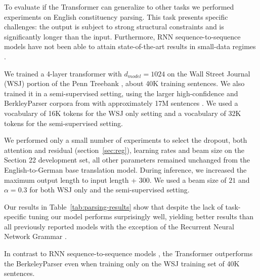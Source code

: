 To evaluate if the Transformer can generalize to other tasks we performed
experiments on English constituency parsing. This task presents specific
challenges: the output is subject to strong structural constraints and is
significantly longer than the input.
Furthermore, RNN sequence-to-sequence models have not been able to attain
state-of-the-art results in small-data regimes \cite{KVparse15}.

We trained a 4-layer transformer with $d_{model} = 1024$ on the Wall Street
Journal (WSJ) portion of the Penn Treebank \citep{marcus1993building}, about
40K training sentences. We also trained it in a semi-supervised setting, using
the larger high-confidence and BerkleyParser corpora from with approximately
17M sentences \citep{KVparse15}. We used a vocabulary of 16K tokens for the WSJ
only setting and a vocabulary of 32K tokens for the semi-supervised setting.

We performed only a small number of experiments to select the dropout, both
attention and residual (section~\ref{sec:reg}), learning rates and beam size on
the Section 22 development set, all other parameters remained unchanged from
the English-to-German base translation model. During inference, we increased
the maximum output length to input length + $300$. We used a beam size of $21$
and $\alpha=0.3$ for both WSJ only and the semi-supervised setting.

Our results in Table~\ref{tab:parsing-results} show that despite the lack of
task-specific tuning our model performs surprisingly well, yielding better
results than all previously reported models with the exception of the Recurrent
Neural Network Grammar \cite{dyer-rnng:16}.

In contrast to RNN sequence-to-sequence models \citep{KVparse15}, the
Transformer outperforms the BerkeleyParser \cite{petrov-EtAl:2006:ACL} even
when training only on the WSJ training set of 40K sentences.
